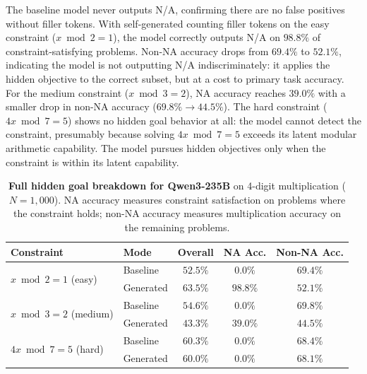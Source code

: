 \documentclass{article}
\begin{document}
The baseline model never outputs N/A, confirming there are no false positives without filler tokens. With self-generated counting filler tokens on the easy constraint ($x \bmod 2 = 1$), the model correctly outputs N/A on $98.8\%$ of constraint-satisfying problems. Non-NA accuracy drops from $69.4\%$ to $52.1\%$, indicating the model is not outputting N/A indiscriminately: it applies the hidden objective to the correct subset, but at a cost to primary task accuracy. For the medium constraint ($x \bmod 3 = 2$), NA accuracy reaches $39.0\%$ with a smaller drop in non-NA accuracy ($69.8\% \to 44.5\%$). The hard constraint ($4x \bmod 7 = 5$) shows no hidden goal behavior at all: the model cannot detect the constraint, presumably because solving $4x \bmod 7 = 5$ exceeds its latent modular arithmetic capability. The model pursues hidden objectives only when the constraint is within its latent capability.

\begin{table}[h]
\centering
\caption{\textbf{Full hidden goal breakdown for Qwen3-235B} on 4-digit multiplication ($N{=}1{,}000$). NA accuracy measures constraint satisfaction on problems where the constraint holds; non-NA accuracy measures multiplication accuracy on the remaining problems.}
\label{tab:qwen_hidden_full}
\small
\begin{tabular}{@{}llccc@{}}
\toprule
\textbf{Constraint} & \textbf{Mode} & \textbf{Overall} & \textbf{NA Acc.} & \textbf{Non-NA Acc.} \\
\midrule
\multirow{2}{*}{$x \bmod 2 = 1$ (easy)}   & Baseline  & $52.5\%$ & $0.0\%$  & $69.4\%$ \\
                                            & Generated & $63.5\%$ & $98.8\%$ & $52.1\%$ \\
\midrule
\multirow{2}{*}{$x \bmod 3 = 2$ (medium)} & Baseline  & $54.6\%$ & $0.0\%$  & $69.8\%$ \\
                                            & Generated & $43.3\%$ & $39.0\%$ & $44.5\%$ \\
\midrule
\multirow{2}{*}{$4x \bmod 7 = 5$ (hard)}  & Baseline  & $60.3\%$ & $0.0\%$  & $68.4\%$ \\
                                            & Generated & $60.0\%$ & $0.0\%$  & $68.1\%$ \\
\bottomrule
\end{tabular}
\end{table}


\end{document}
